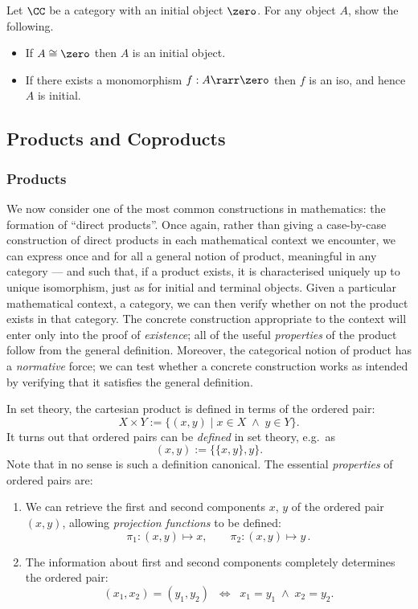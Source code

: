 \documentclass{svmult}
\begin{document}
\begin{myexercise}
Let $\CC$ be a category with an initial object $\zero$. For any object $A$, show the following.
\begin{itemize}
  \item If $A\cong\zero$ then $A$ is an initial object.
  \item If there exists a monomorphism $f:A\rarr\zero$ then $f$ is an iso, and hence $A$ is initial.
\end{itemize}
\end{myexercise}


\subsection{Products and Coproducts}

\subsubsection{Products}
We now consider one of the most common constructions in mathematics: the formation of ``direct products''. Once again, rather than giving a case-by-case construction of direct products in each mathematical context we encounter, we can express once and for all a general notion of product, meaningful in any category --- and such that, if a product exists, it is characterised uniquely up to unique isomorphism, just as for initial and terminal objects. Given a particular mathematical context, \ie a category, we can then verify whether on not the product exists in that category. The concrete construction appropriate to the context will enter only into the proof of \emph{existence}; all of the useful \emph{properties} of the product follow from the general definition. Moreover, the categorical notion of product has a \emph{normative} force; we can test whether a concrete construction works as intended by verifying that it satisfies the general definition.

In set theory, the cartesian product is defined in terms of the ordered pair:
\[ X \times Y := \{ (x, y) \mid x \in X \; \wedge \; y \in Y \} . \]
It turns out that ordered pairs can be \emph{defined} in set theory, e.g.~as
\[ ( x, y ) := \{ \{ x, y \}, y\} . \]
Note that in no sense is such a definition canonical. The essential \emph{properties} of ordered pairs are:
\begin{enumerate}
\item We can retrieve the first and second components $x$, $y$ of the ordered pair $(x, y )$, allowing \emph{projection functions} to be defined:
\[ \pi_{1} : (x, y) \mapsto x, \qquad \pi_{2} : (x, y) \mapsto y \, . \]
\item The information about first and second components completely determines the ordered pair:
\[ (x_{1}, x_{2} ) =  ( y_{1}, y_{2} ) \;\; \Longleftrightarrow \;\; x_{1} = y_{1} \; \wedge \; x_{2} = y_{2} . \]
\end{enumerate}
\end{document}
